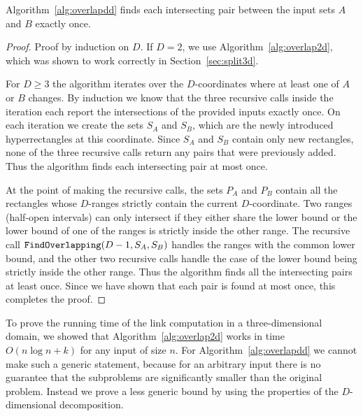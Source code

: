 \documentclass[english,gradu]{tktltiki2018}
\begin{document}
\begin{lem}\label{lem:overlapddok}
Algorithm~\ref{alg:overlapdd} finds each intersecting pair between the input sets $A$ and $B$ exactly once.
\end{lem}
\begin{proof}
Proof by induction on $D$.
If $D=2$, we use Algorithm~\ref{alg:overlap2d}, which was shown to work correctly in Section~\ref{sec:split3d}.

For $D\ge 3$ the algorithm iterates over the $D$-coordinates where at least one of $A$ or $B$ changes.
By induction we know that the three recursive calls inside the iteration each report the intersections of the provided inputs exactly once.
On each iteration we create the sets $S_A$ and $S_B$, which are the newly introduced hyperrectangles at this coordinate.
Since $S_A$ and $S_B$ contain only new rectangles, none of the three recursive calls return any pairs that were previously added.
Thus the algorithm finds each intersecting pair at most once.

At the point of making the recursive calls, the sets $P_A$ and $P_B$ contain all the rectangles whose $D$-ranges strictly contain the current $D$-coordinate.
Two ranges (half-open intervals) can only intersect if they either share the lower bound or the lower bound of one of the ranges is strictly inside the other range.
The recursive call $\texttt{FindOverlapping}(D-1,S_A,S_B)$ handles the ranges with the common lower bound, and the other two recursive calls handle the case of the lower bound being strictly inside the other range.
Thus the algorithm finds all the intersecting pairs at least once.
Since we have shown that each pair is found at most once, this completes the proof.
\end{proof}

To prove the running time of the link computation in a three-dimensional domain, we showed that Algorithm~\ref{alg:overlap2d} works in time $O(n\log n+k)$ for any input of size $n$.
For Algorithm~\ref{alg:overlapdd} we cannot make such a generic statement, because for an arbitrary input there is no guarantee that the subproblems are significantly smaller than the original problem.
Instead we prove a less generic bound by using the properties of the $D$-dimensional decomposition.
\end{document}
